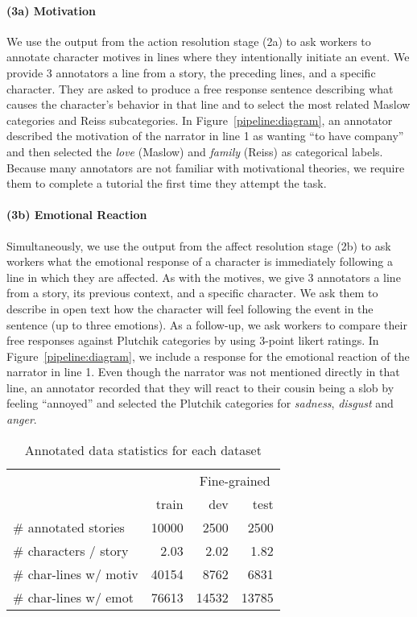 \documentclass[11pt,a4paper]{article}
\begin{document}
\paragraph{(3a) Motivation}
We use the output from the action resolution stage (2a) to ask workers to annotate character motives in lines where they intentionally initiate an event.  We provide 3 annotators a line from a story, the preceding lines, and a specific character.  They are asked to produce a free response sentence describing what causes the character's behavior in that line and to select the most related Maslow categories and Reiss subcategories. In Figure~\ref{pipeline:diagram}, an annotator described the motivation of the narrator in line 1 as wanting ``to have company'' and then selected the \textit{love} (Maslow) and \textit{family} (Reiss) as categorical labels. Because many annotators are not familiar with motivational theories, we require them to complete a tutorial the first time they attempt the task.  

\paragraph{(3b) Emotional Reaction}
Simultaneously, we use the output from the affect resolution stage (2b) to ask workers what the emotional response of a character is immediately following a line in which they are affected.  As with the motives, we give 3 annotators a line from a story, its previous context, and a specific character.  We ask them to describe in open text how the character will feel following the event in the sentence (up to three emotions).  As a follow-up, we ask workers to compare their free responses against Plutchik categories by using 3-point likert ratings. In Figure~\ref{pipeline:diagram}, we include a response for the emotional reaction of the narrator in line 1.  Even though the narrator was not mentioned directly in that line, an annotator recorded that they will react to their cousin being a slob by feeling ``annoyed'' and selected the Plutchik categories for \textit{sadness}, \textit{disgust} and \textit{anger}.


\begin{table}[tb]
\centering
\begin{tabular}{lrrr}
 & & \multicolumn{2}{c}{Fine-grained}\\
 \cmidrule{3-4}
& train & dev & test \\
\# annotated stories         & 10000  &  2500   &  2500\\
\# characters / story        & 2.03  &  2.02   &  1.82\\
\# char-lines  w/ motiv     &  40154  &  8762  &  6831\\
\# char-lines  w/ emot      &  76613  &  14532 &  13785
\end{tabular}
\caption{Annotated data statistics for each dataset
}
\label{datastats}
\end{table}
\vspace*{-1mm}
\end{document}
